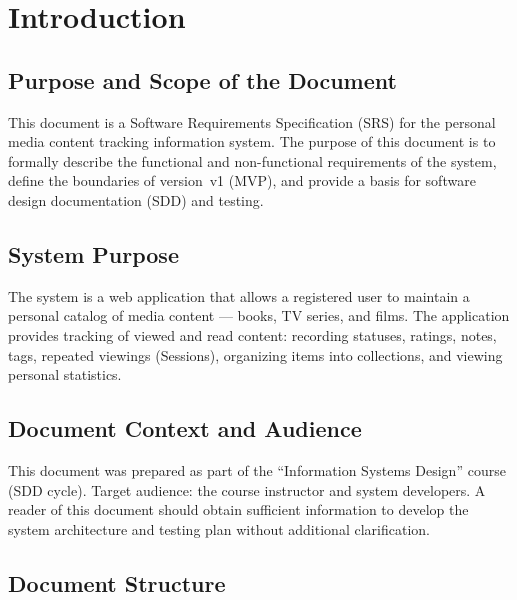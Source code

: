 \section{Introduction}

\subsection{Purpose and Scope of the Document}

This document is a Software Requirements Specification (SRS) for the personal media content tracking information system. The purpose of this document is to formally describe the functional and non-functional requirements of the system, define the boundaries of version~v1 (MVP), and provide a basis for software design documentation (SDD) and testing. 

\subsection{System Purpose}

The system is a web application that allows a registered user to maintain a personal catalog of media content --- books, TV series, and films. The application provides tracking of viewed and read content: recording statuses, ratings, notes, tags, repeated viewings (Sessions), organizing items into collections, and viewing personal statistics. 

\subsection{Document Context and Audience}

This document was prepared as part of the ``Information Systems Design'' course (SDD cycle). Target audience: the course instructor and system developers. A reader of this document should obtain sufficient information to develop the system architecture and testing plan without additional clarification. 

\subsection{Document Structure}

